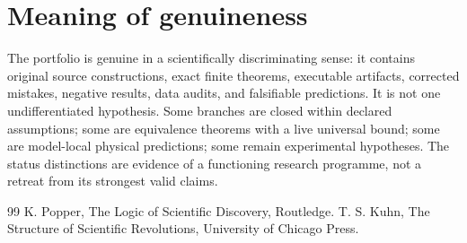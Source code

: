 \documentclass[11pt,a4paper]{article}
\begin{document}
\section{Meaning of genuineness}
The portfolio is genuine in a scientifically discriminating sense: it contains original source constructions, exact finite theorems, executable artifacts, corrected mistakes, negative results, data audits, and falsifiable predictions. It is not one undifferentiated hypothesis. Some branches are closed within declared assumptions; some are equivalence theorems with a live universal bound; some are model-local physical predictions; some remain experimental hypotheses. The status distinctions are evidence of a functioning research programme, not a retreat from its strongest valid claims.

\begin{thebibliography}{99}
 K. Popper, The Logic of Scientific Discovery, Routledge.
 T. S. Kuhn, The Structure of Scientific Revolutions, University of Chicago Press.
\end{thebibliography}
\end{document}
